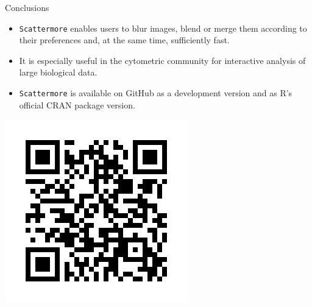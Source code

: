 \documentclass[portrait,a0paper,fontscale=0.26]{baposter}
\begin{document}
\begin{poster}
\begin{posterbox}[column=1, name=conclusion, below=combined_plotting, bottomaligned=documentation, headerColorOne=cyan!80!blue!66!black, boxColorOne=cyan!80!blue!10, headerFontColor=white]{Conclusions}
\begin{itemize}
\item \texttt{Scattermore} enables users to blur images, blend or merge them according to their preferences and, at the same time, sufficiently fast.
\item It is especially useful in the cytometric community for interactive analysis of large biological data.
\item \texttt{Scattermore} is available on GitHub as a development version and as R's official CRAN package version.
\end{itemize}
\begin{center}
\includegraphics[width=0.15\linewidth]{img/qr_code.png}
\end{center}
\end{posterbox}

\end{poster}
\end{document}
